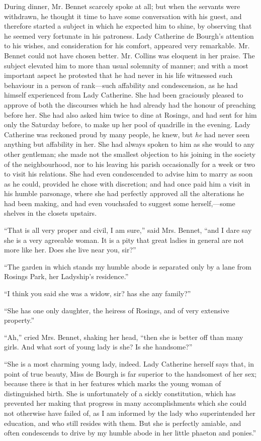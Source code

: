 \documentclass[12pt]{book}
\begin{document}
During dinner, Mr. Bennet scarcely spoke at all; but when the servants were withdrawn, he thought it time to have some conversation with his guest, and therefore started a subject in which he expected him to shine, by observing that he seemed very fortunate in his patroness. Lady Catherine de Bourgh's attention to his wishes, and consideration for his comfort, appeared very remarkable. Mr. Bennet could not have chosen better. Mr. Collins was eloquent in her praise. The subject elevated him to more than usual solemnity of manner; and with a most important aspect he protested that he had never in his life witnessed such behaviour in a person of rank---such affability and condescension, as he had himself experienced from Lady Catherine. She had been graciously pleased to approve of both the discourses which he had already had the honour of preaching before her. She had also asked him twice to dine at Rosings, and had sent for him only the Saturday before, to make up her pool of quadrille in the evening. Lady Catherine was reckoned proud by many people, he knew, but \textit{he} had never seen anything but affability in her. She had always spoken to him as she would to any other gentleman; she made not the smallest objection to his joining in the society of the neighbourhood, nor to his leaving his parish occasionally for a week or two to visit his relations. She had even condescended to advise him to marry as soon as he could, provided he chose with discretion; and had once paid him a visit in his humble parsonage, where she had perfectly approved all the alterations he had been making, and had even vouchsafed to suggest some herself,---some shelves in the closets upstairs.

``That is all very proper and civil, I am sure,'' said Mrs. Bennet, ``and I dare say she is a very agreeable woman. It is a pity that great ladies in general are not more like her. Does she live near you, sir?''

``The garden in which stands my humble abode is separated only by a lane from Rosings Park, her Ladyship's residence.''

``I think you said she was a widow, sir? has she any family?''

``She has one only daughter, the heiress of Rosings, and of very extensive property.''

``Ah,'' cried Mrs. Bennet, shaking her head, ``then she is better off than many girls. And what sort of young lady is she? Is she handsome?''

``She is a most charming young lady, indeed. Lady Catherine herself says that, in point of true beauty, Miss de Bourgh is far superior to the handsomest of her sex; because there is that in her features which marks the young woman of distinguished birth. She is unfortunately of a sickly constitution, which has prevented her making that progress in many accomplishments which she could not otherwise have failed of, as I am informed by the lady who superintended her education, and who still resides with them. But she is perfectly amiable, and often condescends to drive by my humble abode in her little phaeton and ponies.''
\end{document}
